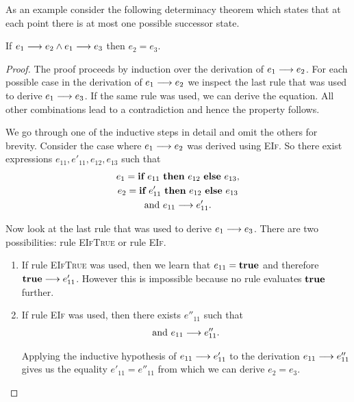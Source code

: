 {As an example consider the following determinacy theorem which states that at
each point there is at most one possible successor state.
\begin{thm}[Determinacy]
  If ${e_1} \longrightarrow {e_2} \wedge {e_1} \longrightarrow {e_3}$ then $e_2 = e_3$.
\end{thm}

\begin{proof}
  The proof proceeds by induction over the derivation of ${e_1} \longrightarrow {e_2}$. For
  each possible case in the derivation of ${e_1} \longrightarrow {e_2}$ we inspect the last
  rule that was used to derive ${e_1} \longrightarrow {e_3}$. If the same rule was used, we
  can derive the equation. All other combinations lead to a contradiction and
  hence the property follows.

  We go through one of the inductive steps in detail and omit the others for
  brevity. Consider the case where ${e_1} \longrightarrow {e_2}$ was derived using
  \textsc{EIf}. So there exist expressions $e_{11}, e'_{11}, e_{12}, e_{13}$
  such that
  \begin{gather*}
    e_1 = \textbf{if}~{e_{11}}~\textbf{then}~{e_{12}}~\textbf{else}~{e_{13}}, \\
    e_2 = \textbf{if}~{e'_{11}}~\textbf{then}~{e_{12}}~\textbf{else}~{e_{13}} \\
    \text{and}~{e_{11}} \longrightarrow {e'_{11}}.
  \end{gather*}

  Now look at the last rule that was used to derive ${e_1} \longrightarrow {e_3}$. There are
  two possibilities: rule \textsc{EIfTrue} or rule \textsc{EIf}.

  \begin{enumerate}
  \item If rule \textsc{EIfTrue} was used, then we learn that $e_{11} = \textbf{true}$
    and therefore ${\textbf{true}} \longrightarrow {e'_{11}}$. However this is impossible because no
    rule evaluates $\textbf{true}$ further.

  \item If rule \textsc{EIf} was used, then there exists $e''_{11}$ such that
    \begin{gather*}
      \text{and}~{e_{11}} \longrightarrow {e''_{11}}.
    \end{gather*}

    Applying the inductive hypothesis of ${e_{11}} \longrightarrow {e'_{11}}$ to the
    derivation ${e_{11}} \longrightarrow {e''_{11}}$ gives us the equality
    $e'_{11} = e''_{11}$ from which we can derive $e_2 = e_3$.
  \end{enumerate}
\end{proof}



}
